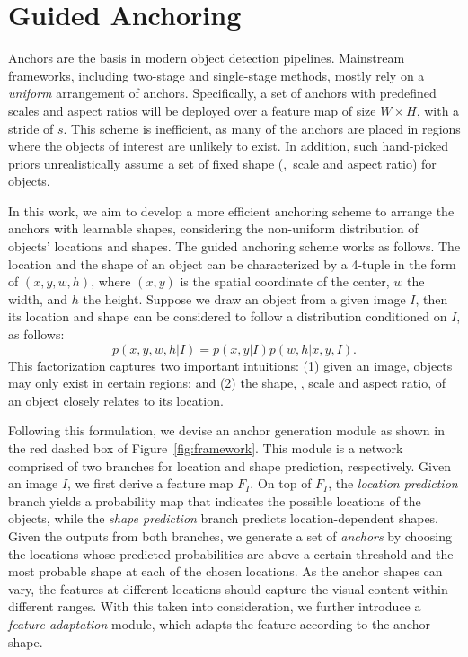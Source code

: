 \documentclass[10pt,twocolumn,letterpaper]{article}
\begin{document}
\section{Guided Anchoring}
\label{sec:methodology}




Anchors are the basis in modern object detection pipelines. Mainstream
frameworks, including two-stage and single-stage methods,
mostly rely on a \emph{uniform} arrangement of anchors.
Specifically, a set of anchors with predefined scales and aspect ratios
will be deployed over a feature map of size $W \times H$, with a stride of
$s$. This scheme is inefficient, as many of the anchors are placed in
regions where the objects of interest are unlikely to exist.
In addition, such hand-picked priors unrealistically assume a set of fixed shape
(\ie,~scale and aspect ratio) for objects.



In this work, we aim to develop a more efficient anchoring scheme to arrange the anchors with learnable shapes,
considering the non-uniform distribution of objects' locations and shapes.
The guided anchoring scheme works as follows.
The location and the shape of an object can be characterized by a 4-tuple
in the form of $(x, y, w, h)$,
where $(x, y)$ is the spatial coordinate of the center, $w$ the width,
and $h$ the height. Suppose we draw an object from a given image $I$, then
its location and shape can be considered to follow a distribution conditioned
on $I$, as follows:
\begin{equation}
	p(x,y,w,h|I)=p(x,y|I)p(w,h|x,y,I).
\end{equation}
This factorization captures two important intuitions:
(1) given an image, objects may only exist in certain regions; and
(2) the shape, \ie, scale and aspect ratio, of an object closely relates to
its location.



Following this formulation, we devise an anchor generation module
as shown in the red dashed box of Figure~\ref{fig:framework}. This module
is a network comprised of two branches for location
and shape prediction, respectively.
Given an image $I$, we first derive a feature map $F_I$. On top of $F_I$,
the \emph{location prediction} branch yields a probability map that indicates
the possible locations of the objects, while the \emph{shape prediction}
branch predicts location-dependent shapes.
Given the outputs from both branches, we generate a set of \emph{anchors} by
choosing the locations whose predicted probabilities are above a certain threshold
and the most probable shape at each of the chosen locations.
As the anchor shapes can vary, the features at different locations should
capture the visual content within different ranges.
With this taken into consideration, we further introduce a
\emph{feature adaptation} module, which adapts the feature according to the anchor shape.
\end{document}
